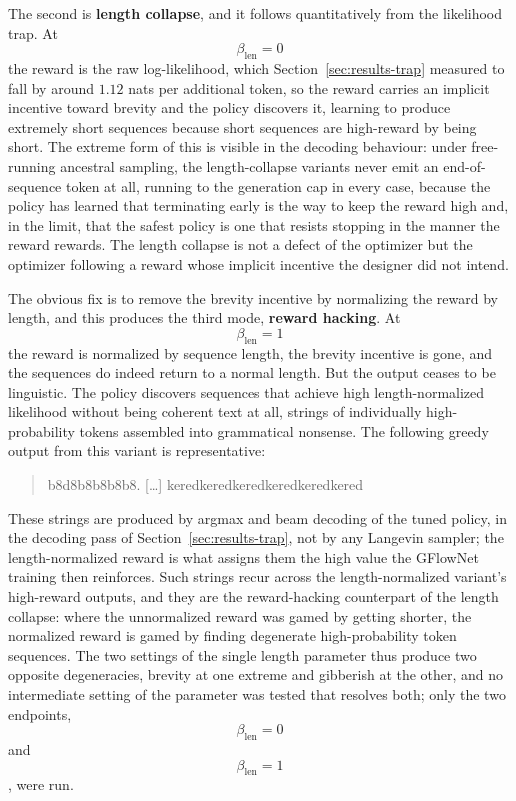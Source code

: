 The second is \textbf{length collapse}, and it follows quantitatively from the likelihood trap. At $$\beta_{\text{len}} = 0$$ the reward is the raw log-likelihood, which Section~\ref{sec:results-trap} measured to fall by around $1.12$ nats per additional token, so the reward carries an implicit incentive toward brevity and the policy discovers it, learning to produce extremely short sequences because short sequences are high-reward by being short.
The extreme form of this is visible in the decoding behaviour: under free-running ancestral sampling, the length-collapse variants never emit an end-of-sequence token at all, running to the generation cap in every case, because the policy has learned that terminating early is the way to keep the reward high and, in the limit, that the safest policy is one that resists stopping in the manner the reward rewards.
The length collapse is not a defect of the optimizer but the optimizer following a reward whose implicit incentive the designer did not intend.

The obvious fix is to remove the brevity incentive by normalizing the reward by length, and this produces the third mode, \textbf{reward hacking}. At $$\beta_{\text{len}} = 1$$ the reward is normalized by sequence length, the brevity incentive is gone, and the sequences do indeed return to a normal length. But the output ceases to be linguistic. The policy discovers sequences that achieve high length-normalized likelihood without being coherent text at all, strings of individually high-probability tokens assembled into grammatical nonsense. The following greedy output from this variant is representative:

\begin{quote}
\ttfamily b8d8b8b8b8b8. [\ldots] keredkeredkeredkeredkeredkered
\end{quote}

These strings are produced by argmax and beam decoding of the tuned policy, in the decoding pass of Section~\ref{sec:results-trap}, not by any Langevin sampler; the length-normalized reward is what assigns them the high value the GFlowNet training then reinforces. Such strings recur across the length-normalized variant's high-reward outputs, and they are the reward-hacking counterpart of the length collapse: where the unnormalized reward was gamed by getting shorter, the normalized reward is gamed by finding degenerate high-probability token sequences.
The two settings of the single length parameter thus produce two opposite degeneracies, brevity at one extreme and gibberish at the other, and no intermediate setting of the parameter was tested that resolves both; only the two endpoints, $$\beta_{\text{len}} = 0$$ and $$\beta_{\text{len}} = 1$$, were run.

